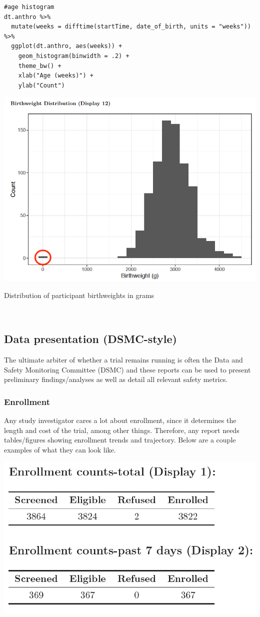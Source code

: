 \documentclass[
]{book}
\begin{document}
\begin{verbatim}
#age histogram
dt.anthro %>%
  mutate(weeks = difftime(startTime, date_of_birth, units = "weeks")) %>%
  ggplot(dt.anthro, aes(weeks)) +
    geom_histogram(binwidth = .2) +
    theme_bw() +
    xlab("Age (weeks)") +
    ylab("Count")
\end{verbatim}

\includegraphics[width=0.6\linewidth,height=0.4\textheight]{images/report-images/birthweight}

Distribution of participant birthweights in grams

\(~\)

\subsection{Data presentation (DSMC-style)}\label{data-presentation-dsmc-style}

The ultimate arbiter of whether a trial remains running is often the Data and Safety Monitoring Committee (DSMC) and these reports can be used to present preliminary findings/analyses as well as detail all relevant safety metrics.

\subsubsection{Enrollment}\label{enrollment}

Any study investigator cares a lot about enrollment, since it determines the length and cost of the trial, among other things. Therefore, any report needs tables/figures showing enrollment trends and trajectory. Below are a couple examples of what they can look like.

\includegraphics[width=0.5\linewidth,height=0.3\textheight]{images/report-images/enrollment1}
\end{document}
